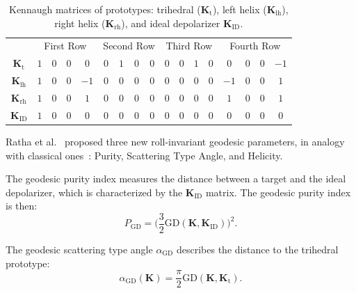 \documentclass[journal]{IEEEtran}
\begin{document}
\begin{table}[hbt]
\centering
\caption{Kennaugh matrices of prototypes: {trihedral} ($\bm K_\text{t}$), 
		{left helix} ($\bm K_{\text{lh}}$), 
		{right helix} ($\bm K_{\text{rh}}$), 
		and ideal depolarizer $\bm K_{\text{ID}}$.}\label{Tab:ElementaryK}
\setlength{\tabcolsep}{4pt}
\begin{tabular}{*{17}{c}}\toprule
&	\multicolumn{4}{c}{First Row} 
	& \multicolumn{4}{c}{Second Row} 
	& \multicolumn{4}{c}{Third Row} 
	& \multicolumn{4}{c}{Fourth Row}\\ 
	\cmidrule(rl){2-5} \cmidrule(rl){6-9} \cmidrule(rl){10-13} \cmidrule(rl){14-17} 
$\bm K_{\text{t}}$
	& $1$ & $0$ & $0$ & $0$
	& $0$ & $1$ & $0$ & $0$
	& $0$ & $0$ & $1$ & $0$
	& $0$ & $0$ & $0$ & $-1$ \\
$ \bm K_{\text{lh}}$
	& $1$ & $0$ & $0$ & $-1$
	& $0$ & $0$ & $0$ & $0$
	& $0$ & $0$ & $0$ & $0$
	& $-1$ & $0$ & $0$ & $1$\\
$ \bm K_{\text{rh}}$
	& $1$ & $0$ & $0$ & $1$
	& $0$ & $0$ & $0$ & $0$
	& $0$ & $0$ & $0$ & $0$
	& $1$ & $0$ & $0$ & $1$\\
$\bm{K}_{\text{ID}}$
	& $1$ & $0$ & $0$ & $0$
	& $0$ & $0$ & $0$ & $0$
	& $0$ & $0$ & $0$ & $0$
	& $0$ & $0$ & $0$ & $0$ \\
\bottomrule
\end{tabular}
\end{table}

Ratha et al.~\cite{APolSARScatteringPowerFactorizationFrameworkandNovelRollInvariantParametersBasedUnsupervisedClassificationSchemeUsingaGeodesicDistanceinpress} proposed three new roll-invariant geodesic parameters, in analogy with classical ones~\cite{CloudePottier:97}: Purity, Scattering Type Angle, and Helicity.

The geodesic purity index measures the distance between a target and the ideal depolarizer, which is characterized by the $\bm{K}_{\text{ID}}$ matrix.
The geodesic purity index is then:
\begin{equation}
P_{\text{GD}} = \Big(\frac{3}{2}\text{GD}(\bm{K}, \bm{K}_{\text{ID}})\Big)^2.
\end{equation}

The geodesic scattering type angle $\alpha_{\text{GD}}$ describes 
the distance to the trihedral prototype:
\begin{equation}
\alpha_{\text{GD}}(\bm{K}) = \frac{\pi}{2}  \text{GD}(\bm{K},\bm{K}_{\text{t}}).
\end{equation}
\end{document}
